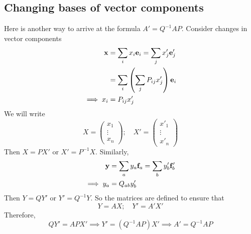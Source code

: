 \subsection{Changing bases of vector components}
Here is another way to arrive at the formula \(A' = Q^{-1}AP\).
Consider changes in vector components
\begin{align*}
	\vb x        & = \sum_i x_i \vb e_i = \sum_j x_j' \vb e'_j       \\
	             & = \sum_i\left( \sum_j P_{ij} x'_j \right) \vb e_i \\
	\implies x_i & = P_{ij} x'_j
\end{align*}
We will write
\[
	X = \begin{pmatrix}
		x_1 \\ \vdots \\ x_n
	\end{pmatrix};\quad X' = \begin{pmatrix}
		x'_1 \\ \vdots \\ x'_n
	\end{pmatrix}
\]
Then \(X = PX'\) or \(X' = P^{-1}X\).
Similarly,
\begin{align*}
	\vb y        & = \sum_a y_a \vb f_a = \sum_b y_b' \vb f'_b \\
	\implies y_a & = Q_{ab} y'_b
\end{align*}
Then \(Y = QY'\) or \(Y' = Q^{-1}Y\).
So the matrices are defined to ensure that
\[
	Y = AX;\quad Y' = A'X'
\]
Therefore,
\[
	QY' = APX' \implies Y' = (Q^{-1}AP)X' \implies A' = Q^{-1}AP
\]

